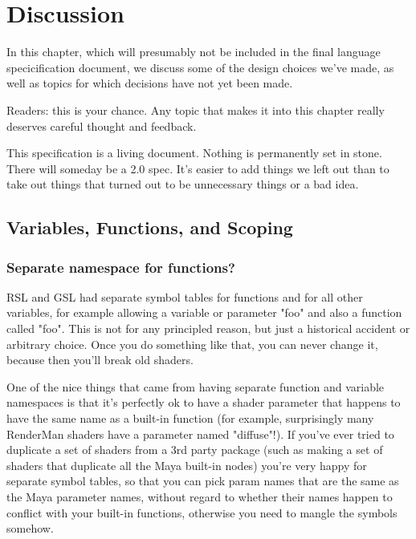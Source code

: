 \documentclass[11pt,letterpaper]{book}
\begin{document}
\chapter{Discussion}
\label{chap:discussion}
\begin{annotate}

In this chapter, which will presumably not be included in the final
language specicification document, we discuss some of the design choices
we've made, as well as topics for which decisions have not yet been
made.  

Readers: this is your chance.  Any topic that makes it into this chapter
really deserves careful thought and feedback.

This specification is a living document.  Nothing is permanently set in
stone.  There will someday be a 2.0 spec.  It's easier to add things we
left out than to take out things that turned out to be unnecessary
things or a bad idea.

\section{Variables, Functions, and Scoping}

\subsection{Separate namespace for functions?}

\NEW
RSL and GSL had separate symbol tables for functions and for all other
variables, for example allowing a variable or parameter "foo" and also a
function called "foo". This is not for any principled reason, but just a
historical accident or arbitrary choice. Once you do something like
that, you can never change it, because then you'll break old shaders.

One of the nice things that came from having separate function and
variable namespaces is that it's perfectly ok to have a shader parameter
that happens to have the same name as a built-in function (for example,
surprisingly many RenderMan shaders have a parameter named
"diffuse"!). If you've ever tried to duplicate a set of shaders from a
3rd party package (such as making a set of shaders that duplicate all
the Maya built-in nodes) you're very happy for separate symbol tables,
so that you can pick param names that are the same as the Maya parameter
names, without regard to whether their names happen to conflict with
your built-in functions, otherwise you need to mangle the symbols
somehow.


\end{annotate}
\end{document}
